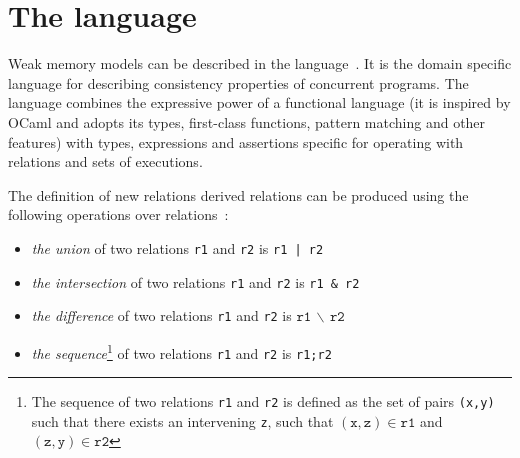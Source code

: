 \section{The \cat language}

Weak memory models can be described in the \cat language~\cite{alglave2016syntax}. It is the domain specific language for describing consistency properties of concurrent programs. The \cat language combines the expressive power of a functional language (it is inspired by OCaml and adopts its types, first-class functions, pattern matching and other features) with types, expressions and assertions specific for operating with relations and sets of executions.


The definition of new relations  derived relations can be produced using the following operations over relations~\cite{alglave2016syntax}: %

\begin{itemize}
	\item \textit{the union} of two relations \texttt{r1} and \texttt{r2} is \texttt{r1\,|\,r2}
	\item \textit{the intersection} of two relations \texttt{r1} and \texttt{r2} is \texttt{r1\,\&\,r2}
	\item \textit{the difference} of two relations \texttt{r1} and \texttt{r2} is $\mathtt{r1\,\backslash\,r2}$
	\item \textit{the sequence}\footnote{The sequence of two relations \texttt{r1} and \texttt{r2} is defined as the set of pairs \texttt{(x,y)} such that there exists an intervening \texttt{z}, such that $\mathtt{(x,z)} \in \mathtt{r1}$ and $\mathtt{(z,y)} \in \mathtt{r2}$}
	of two relations \texttt{r1} and \texttt{r2} is \texttt{r1;r2}
\end{itemize}






